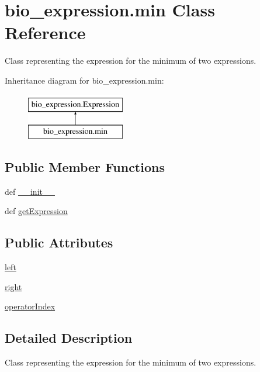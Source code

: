 \hypertarget{classbio__expression_1_1min}{\section{bio\+\_\+expression.\+min Class Reference}
\label{classbio__expression_1_1min}
}


Class representing the expression for the minimum of two expressions.  


Inheritance diagram for bio\+\_\+expression.\+min\+:\begin{figure}[H]
\begin{center}
\leavevmode
\includegraphics[height=2.000000cm]{dd/df7/classbio__expression_1_1min}
\end{center}
\end{figure}
\subsection*{Public Member Functions}
\begin{DoxyCompactItemize}
\item 
def \hyperlink{classbio__expression_1_1min_a3183866608db6263fa374eb99a3b6f30}{\+\_\+\+\_\+init\+\_\+\+\_\+}
\item 
def \hyperlink{classbio__expression_1_1min_a45f7d5203f52cf68d3e2738424558e93}{get\+Expression}
\end{DoxyCompactItemize}
\subsection*{Public Attributes}
\begin{DoxyCompactItemize}
\item 
\hyperlink{classbio__expression_1_1min_aad178b15b6a38a3487f0201ddf9b05da}{left}
\item 
\hyperlink{classbio__expression_1_1min_a598a7f87c581405f46379788c9cfc682}{right}
\item 
\hyperlink{classbio__expression_1_1min_ad7874a97ff7efd3577be120adbfb1979}{operator\+Index}
\end{DoxyCompactItemize}


\subsection{Detailed Description}
Class representing the expression for the minimum of two expressions. 

